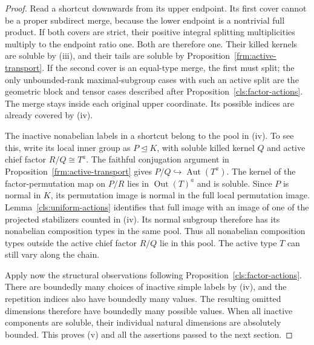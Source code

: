 \begin{proof}
Read a shortcut downwards from its upper endpoint.  Its first
cover cannot be a proper subdirect merge, because the lower endpoint
is a nontrivial full product.  If both covers are strict, their
positive integral splitting multiplicities multiply to the endpoint
ratio one.  Both are therefore one.  Their killed kernels are
soluble by (iii), and their tails are soluble by
Proposition~\ref{frm:active-transport}.  If the second cover is an
equal-type merge, the first must split; the only unbounded-rank
maximal-subgroup cases with such an active split are the geometric
block and tensor cases described after
Proposition~\ref{cls:factor-actions}.  The
merge stays inside each original upper coordinate.  Its possible
indices are already covered by (iv).

The inactive nonabelian labels in a shortcut belong to the pool in
(iv). To see this, write its local inner group as $P\trianglelefteq K$,
with soluble killed kernel $Q$ and active chief factor $R/Q\cong T^a$.
The faithful conjugation argument in
Proposition~\ref{frm:active-transport} gives
$P/Q\hookrightarrow\operatorname{Aut}(T^a)$. The kernel of the
factor-permutation map on $P/R$ lies in
$\operatorname{Out}(T)^a$ and is soluble. Since $P$ is normal in $K$,
its permutation image is normal in the full local permutation image.
Lemma~\ref{cls:uniform-actions} identifies that full image with an
image of one of the projected stabilizers counted in (iv). Its normal subgroup
therefore has its nonabelian composition types in the same pool. Thus
all nonabelian composition types outside the active chief factor
$R/Q$ lie in this pool. The active type $T$ can still vary along the chain.

Apply now the structural observations following
Proposition~\ref{cls:factor-actions}. There are boundedly many choices
of inactive simple labels by (iv), and the repetition indices also
have boundedly many values. The resulting omitted dimensions
therefore have boundedly many possible values. When all inactive
components are soluble, their individual natural dimensions are
absolutely bounded. This proves (v) and all the assertions passed
to the next section.
\end{proof}
